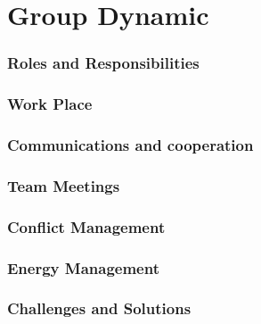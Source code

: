 \chapter{Group Dynamic}
\label{ch:kap10}

\subsection{Roles and Responsibilities}
\label{sec:roles}

\subsection{Work Place}
\label{sec:workPlace}

\subsection{Communications and cooperation}
\label{sec:coommunication}

\subsection{Team Meetings}
\label{sec:groupMeetings}

\subsection{Conflict Management}
\label{sec:conflicts}

\subsection{Energy Management}
\label{sec:energy}

\subsection{Challenges and Solutions}
\label{sec:challenges}
